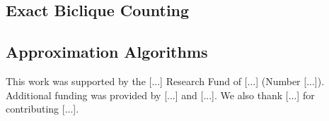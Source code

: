 \documentclass[sigconf, nonacm]{acmart}
\begin{document}
\subsection{Exact Biclique Counting}
%
%

\subsection{Approximation Algorithms}

%
%
%














\begin{acks}
 This work was supported by the [...] Research Fund of [...] (Number [...]). Additional funding was provided by [...] and [...]. We also thank [...] for contributing [...].
\end{acks}




\end{document}
